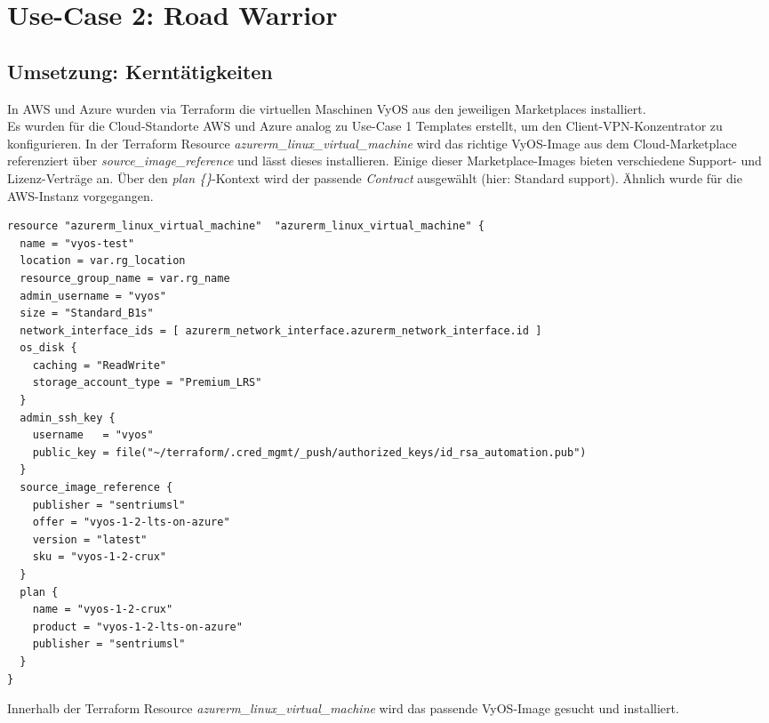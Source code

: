 \section{Use-Case 2: Road Warrior} \label{Use-Case 2: Road Warrior}

\subsection{Umsetzung: Kerntätigkeiten}


In AWS und Azure wurden via Terraform die virtuellen Maschinen VyOS aus den jeweiligen Marketplaces installiert.\\
Es wurden für die Cloud-Standorte AWS und Azure analog zu Use-Case 1 Templates erstellt, um den Client-VPN-Konzentrator zu konfigurieren. In der Terraform Resource \textit{azurerm\_linux\_virtual\_machine} wird das richtige VyOS-Image aus dem Cloud-Marketplace referenziert über \textit{source\_image\_reference} und lässt dieses installieren. Einige dieser Market\-place-Images bieten verschiedene Support- und Lizenz-Verträge an. Über den \textit{plan \{\}}-Kontext wird der passende \textit{Contract} ausgewählt (hier: \glqq Standard support\grqq{}). Ähnlich wurde für die AWS-Instanz vorgegangen. 
\begin{listing}[h]
\begin{verbatim}
resource "azurerm_linux_virtual_machine"  "azurerm_linux_virtual_machine" {
  name = "vyos-test"
  location = var.rg_location
  resource_group_name = var.rg_name
  admin_username = "vyos"
  size = "Standard_B1s"
  network_interface_ids = [ azurerm_network_interface.azurerm_network_interface.id ]
  os_disk {
    caching = "ReadWrite"
    storage_account_type = "Premium_LRS"
  }
  admin_ssh_key {
    username   = "vyos"
    public_key = file("~/terraform/.cred_mgmt/_push/authorized_keys/id_rsa_automation.pub")
  }
  source_image_reference {
    publisher = "sentriumsl"
    offer = "vyos-1-2-lts-on-azure"
    version = "latest"
    sku = "vyos-1-2-crux"
  }
  plan {
    name = "vyos-1-2-crux"
    product = "vyos-1-2-lts-on-azure"
    publisher = "sentriumsl"
  }
}
\end{verbatim}
\caption{Innerhalb der Terraform Resource \textit{azurerm\_linux\_virtual\_machine} wird das passende VyOS-Image gesucht und installiert.}
\label{tf-azure-vyos-machine-image}
\end{listing}\FloatBarrier
